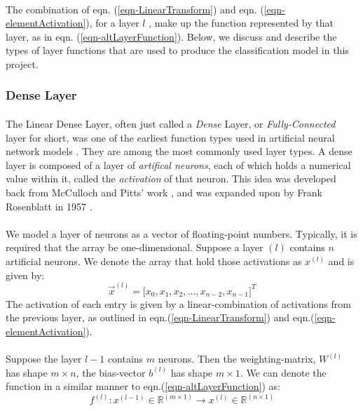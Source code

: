 \documentclass[12pt,letterpaper]{article}
\begin{document}
\paragraph*{}The combination of eqn. (\ref{eqn-LinearTransform}) and eqn. (\ref{eqn-elementActivation}), for a layer $l$ , make up the function represented by that layer, as in eqn. (\ref{eqn-altLayerFunction}). Below, we discuss and describe the types of layer functions that are used to produce the classification model in this project.


\subsubsection{Dense Layer}
\label{subsubsec-DenseLayer}

\paragraph*{}The Linear Dense Layer, often just called a \textit{Dense} Layer, or \textit{Fully-Connected} layer for short, was one of the earliest function types used in artificial neural network models \cite{Geron2,Loy}. They are among the most commonly used layer types. A dense layer is composed of a layer of \textit{artifical neurons}, each of which holds a numerical value within it, called the \textit{activation} of that neuron. This idea was developed back from McCulloch and Pitts' work \cite{McCulloch}, and was expanded upon by Frank Rosenblatt in  1957 \cite{Geron}.

\paragraph*{}We model a layer of neurons as a vector of floating-point numbers. Typically, it is required that the array be one-dimensional. Suppose a layer $(l)$ contains $n$ artificial neurons. We denote the array that hold those activations as $x^{(l)}$ and is given by:
\begin{equation}
\label{layer-DenseNeurons}
\vec{x}^{(l)} = \Big[ x_0, x_1, x_2, \hdots , x_{n-2}, x_{n-1} \Big]^T
\end{equation}
The activation of each entry is given by a linear-combination of activations from the previous layer, as outlined in eqn.(\ref{eqn-LinearTransform}) and eqn.(\ref{eqn-elementActivation}).

\paragraph*{}Suppose the layer $l-1$ contains $m$ neurons. Then the weighting-matrix, $W^{(l)}$ has shape $m \times n$, the bias-vector $b^{(l)}$ has shape $m \times 1$. We can denote the function in a similar manner to eqn.(\ref{eqn-altLayerFunction}) as:
\begin{equation}
\label{eqn-FunctionDense}
f^{(l)} : x^{(l-1)} \in \mathbb{R}^{(m \times 1)} \rightarrow x^{(l)} \in \mathbb{R}^{(n \times 1)}
\end{equation}
\end{document}
